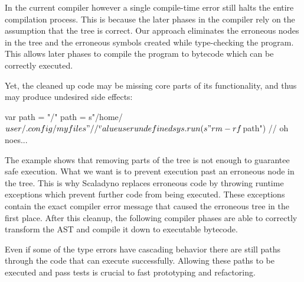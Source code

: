 In the current compiler however a single compile-time error still halts the entire compilation process. This is because the later phases in the compiler rely on the assumption that the tree is correct. Our approach eliminates the erroneous nodes in the tree and the erroneous symbols created while type-checking the program. This allows later phases to compile the program to bytecode which can be correctly executed.

Yet, the cleaned up code may be missing core parts of its functionality, and thus may produce undesired side effects:

\begin{lstlisting-nobreak}
 var path = "/"
 path = s"/home/$user/.config/myfiles"
 //                  ^ value user undefined
 sys.run(s"rm -rf $path") // oh noes...
\end{lstlisting-nobreak}

The example shows that removing parts of the tree is not enough to guarantee safe execution. What we want is to prevent execution past an erroneous node in the tree. This is why Scaladyno replaces erroneous code by throwing runtime exceptions which prevent further code from being executed. These exceptions contain the exact compiler error message that caused the erroneous tree in the first place. After this cleanup, the following compiler phases are able to correctly transform the AST and compile it down to executable bytecode.

Even if some of the type errors have cascading behavior there are still paths through the code that can execute successfully. Allowing these paths to be executed and pass tests is crucial to fast prototyping and refactoring.
